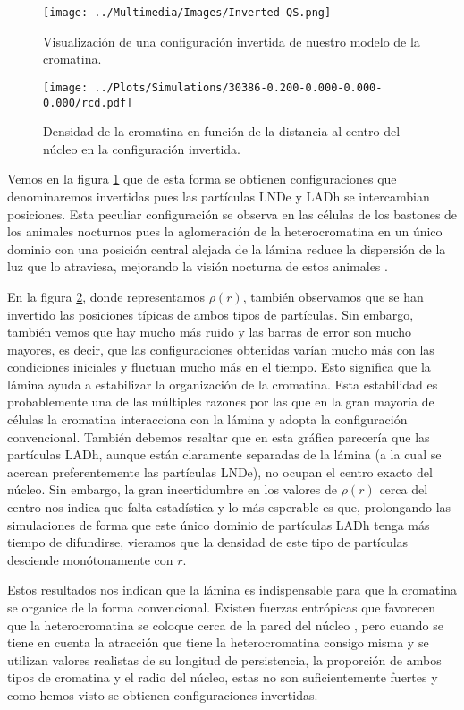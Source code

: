 \begin{figure}[p]
    \centering
    \texttt{[image: ../Multimedia/Images/Inverted-QS.png]}
    \caption{Visualización de una configuración invertida de nuestro modelo de la cromatina.}
    \label{fig:vmd_QS_image_i}
\end{figure}

\begin{figure}[p]
    \centering
    \texttt{[image: ../Plots/Simulations/30386-0.200-0.000-0.000-0.000/rcd.pdf]}
    \caption{Densidad de la cromatina en función de la distancia al centro del núcleo en la configuración invertida.}
    \label{fig:rcd_i}
\end{figure}

Vemos en la figura \ref{fig:vmd_QS_image_i} que de esta forma se obtienen configuraciones que denominaremos invertidas pues las partículas LNDe y LADh se intercambian posiciones. Esta peculiar configuración se observa en las células de los bastones de los animales nocturnos pues la aglomeración de la heterocromatina en un único dominio con una posición central alejada de la lámina reduce la dispersión de la luz que lo atraviesa, mejorando la visión nocturna de estos animales \cite{Camara2023}.

En la figura \ref{fig:rcd_i}, donde representamos $\rho(r)$, también observamos que se han invertido las posiciones típicas de ambos tipos de partículas. Sin embargo, también vemos que hay mucho más ruido y las barras de error son mucho mayores, es decir, que las configuraciones obtenidas varían mucho más con las condiciones iniciales y fluctuan mucho más en el tiempo. Esto significa que la lámina ayuda a estabilizar la organización de la cromatina. Esta estabilidad es probablemente una de las múltiples razones por las que en la gran mayoría de células la cromatina interacciona con la lámina y adopta la configuración convencional. También debemos resaltar que en esta gráfica parecería que las partículas LADh, aunque están claramente separadas de la lámina (a la cual se acercan preferentemente las partículas LNDe), no ocupan el centro exacto del núcleo. Sin embargo, la gran incertidumbre en los valores de $\rho(r)$ cerca del centro nos indica que falta estadística y lo más esperable es que, prolongando las simulaciones de forma que este único dominio de partículas LADh tenga más tiempo de difundirse, vieramos que la densidad de este tipo de partículas desciende monótonamente con $r$.

Estos resultados nos indican que la lámina es indispensable para que la cromatina se organice de la forma convencional. Existen fuerzas entrópicas que favorecen que la heterocromatina se coloque cerca de la pared del núcleo \cite{Finan2010}, pero cuando se tiene en cuenta la atracción que tiene la heterocromatina consigo misma y se utilizan valores realistas de su longitud de persistencia, la proporción de ambos tipos de cromatina y el radio del núcleo, estas no son suficientemente fuertes y como hemos visto se obtienen configuraciones invertidas.

